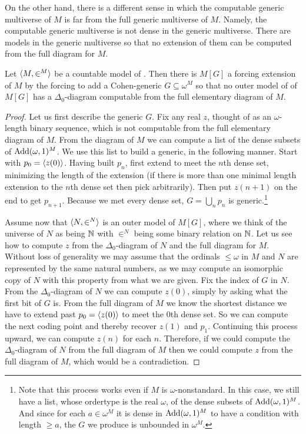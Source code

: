 \documentclass{amsart}
\begin{document}
On the other hand, there is a different sense in which the computable generic multiverse of $M$ is far from the full generic multiverse of $M$. Namely, the computable generic multiverse is not dense in the generic multiverse. There are models in the generic multiverse so that no extension of them can be computed from the full diagram for $M$.

\begin{theorem}
Let $\<M,\in^M>$ be a countable model of \ZF. Then there is $M[G]$ a forcing extension of $M$ by the forcing to add a Cohen-generic $G \subseteq \omega^M$ so that no outer model of of $M[G]$ has a $\Delta_0$-diagram computable from the full elementary diagram of $M$.
\end{theorem}

\begin{proof}
Let us first describe the generic $G$. Fix any real $z$, thought of as an $\omega$-length binary sequence, which is not computable from the full elementary diagram of $M$. From the diagram of $M$ we can compute a list of the dense subsets of $\mathop{\rm Add}(\omega,1)^M$. We use this list to build a generic, in the following manner. Start with $p_0 = \<z(0)>$. Having built $p_n$, first extend to meet the $n$th dense set, minimizing the length of the extension (if there is more than one minimal length extension to the $n$th dense set then pick arbitrarily). Then put $z(n+1)$ on the end to get $p_{n+1}$. Because we met every dense set, $G = \bigcup_n p_n$ is generic.\footnote{Note that this process works even if $M$ is $\omega$-nonstandard. In this case, we still have a list, whose ordertype is the real $\omega$, of the dense subsets of $\mathop{\rm Add}(\omega,1)^M$. And since for each $a \in \omega^M$ it is dense in $\mathop{\rm Add}(\omega,1)^M$ to have a condition with length $\ge a$, the $G$ we produce is unbounded in $\omega^M$.}

Assume now that $\<N,\in^N>$ is an outer model of $M[G]$, where we think of the universe of $N$ as being ${\mathbb N}$ with $\in^N$ being some binary relation on ${\mathbb N}$. Let us see how to compute $z$ from the $\Delta_0$-diagram of $N$ and the full diagram for $M$. Without loss of generality we may assume that the ordinals $\le \omega$ in $M$ and $N$ are represented by the same natural numbers, as we may compute an isomorphic copy of $N$ with this property from what we are given. Fix the index of $G$ in $N$. From the $\Delta_0$-diagram of $N$ we can compute $z(0)$, simply by asking what the first bit of $G$ is. From the full diagram of $M$ we know the shortest distance we have to extend past $p_0 = \<z(0)>$ to meet the $0$th dense set. So we can compute the next coding point and thereby recover $z(1)$ and $p_1$. Continuing this process upward, we can compute $z(n)$ for each $n$. Therefore, if we could compute the $\Delta_0$-diagram of $N$ from the full diagram of $M$ then we could compute $z$ from the full diagram of $M$, which would be a contradiction.
\end{proof}
\end{document}
